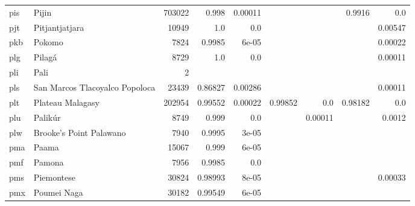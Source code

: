 \documentclass[11pt]{article}
\begin{document}
\begin{table*}[h]
{\begin{tabular}{llrrrrrrr}
pis         & Pijin         & 703022         & 0.998         & 0.00011         &          &          & 0.9916         & 0.0         \\

pjt         & Pitjantjatjara         & 10949         & 1.0         & 0.0         &          &          &          & 0.00547         \\

pkb         & Pokomo         & 7824         & 0.9985         & 6e-05         &          &          &          & 0.00022         \\

plg         & Pilagá         & 8729         & 1.0         & 0.0         &          &          &          & 0.00011         \\

pli         & Pali         & 2         &          &          &          &          &          &          \\

pls         & San Marcos Tlacoyalco Popoloca         & 23439         & 0.86827         & 0.00286         &          &          &          & 0.00011         \\

plt         & Plateau Malagasy         & 202954         & 0.99552         & 0.00022         & 0.99852         & 0.0         & 0.98182         & 0.0         \\

plu         & Palikúr         & 8749         & 0.999         & 0.0         &          & 0.00011         &          & 0.0012         \\

plw         & Brooke's Point Palawano         & 7940         & 0.9995         & 3e-05         &          &          &          &          \\

pma         & Paama         & 15067         & 0.999         & 6e-05         &          &          &          &          \\

pmf         & Pamona         & 7956         & 0.9985         & 0.0         &          &          &          &          \\

pms         & Piemontese         & 30824         & 0.98993         & 8e-05         &          &          &          & 0.00033         \\

pmx         & Poumei Naga         & 30182         & 0.99549         & 6e-05         &          &          &          &          \\


\end{tabular}}
\end{table*}
\end{document}
